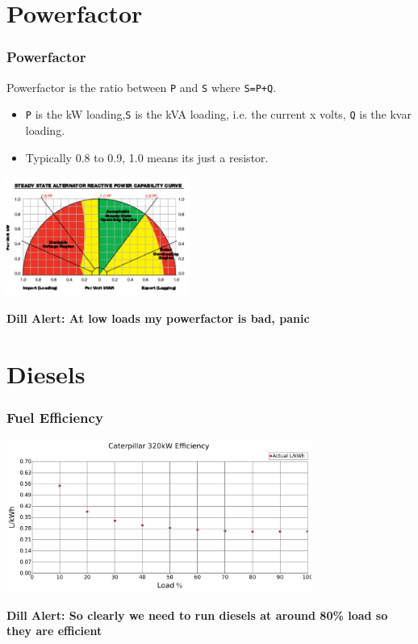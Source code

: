 \documentclass{beamer}
\def\dill#1{\textcolor{RawSienna}{\textbf{Dill Alert: #1}}}
\begin{document}
\section{Powerfactor}
\begin{frame}\frametitle{Powerfactor}
Powerfactor is the ratio between \texttt{P} and \texttt{S} where
\texttt{S=P+Q}.
\begin{itemize}
\item \texttt{P} is the kW loading,\texttt{S} is the kVA loading,
  i.e. the current x volts, \texttt{Q} is the kvar loading.
\pause
\item Typically 0.8 to 0.9, 1.0 means its just a resistor.
\end{itemize}
\pause
\includegraphics[width=6cm]{pf.pdf}
\pause

\dill{At low loads my powerfactor is bad, panic}
\end{frame}

\section{Diesels}
\begin{frame}\frametitle{Fuel Efficiency}
\includegraphics[width=10cm]{limits/figFuelCurve1.pdf}
\pause

\dill{So clearly we need to run diesels at around 80\% load 
  so they are efficient}
\end{frame}
\end{document}
